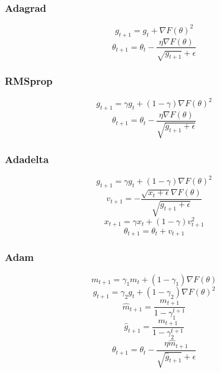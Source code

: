 \documentclass{beamer}
\begin{document}
\begin{frame}
\frametitle{Adagrad}
\[g_{t+1} = g_t + \nabla F(\theta) ^2\]
\[\theta_{t+1} = \theta_t - \frac{\eta \nabla F(\theta)}{\sqrt{g_{t+1}} + \epsilon}\]	
\end{frame}

\begin{frame}
\frametitle{RMSprop}
\[g_{t+1} = \gamma g_t + (1 - \gamma) \nabla F(\theta)^2\]
\[\theta_{t+1} = \theta_t - \frac{\eta \nabla F(\theta)}{\sqrt{g_{t+1} + \epsilon}}\]	
\end{frame}

\begin{frame}
\frametitle{Adadelta}
\[g_{t+1} = \gamma g_t + (1 - \gamma) \nabla F(\theta)^2\]
\[v_{t+1} = - \frac{\sqrt{x_t + \epsilon} \nabla F(\theta)}{\sqrt{g_{t+1} + \epsilon}}\]
\[x_{t+1} = \gamma x_t + (1 - \gamma) v_{t+1}^2\]
\[\theta_{t+1} = \theta_t + v_{t+1}\]	
\end{frame}

\begin{frame}
\frametitle{Adam}
\[m_{t+1} = \gamma_1 m_t + (1 - \gamma_1) \nabla F(\theta)\]
\[g_{t+1} = \gamma_2 g_t + (1 - \gamma_2) \nabla F(\theta)^2\]
\[\hat{m}_{t+1} = \frac{m_{t+1}}{1 - \gamma_1^{t+1}}\]
\[\hat{g}_{t+1} = \frac{m_{t+1}}{1 - \gamma_2^{t+1}}\]
\[\theta_{t+1} = \theta_t - \frac{\eta \hat{m}_{t+1}}{\sqrt{\hat{g}_{t+1}} + \epsilon}\]	
\end{frame}

	
\end{document}
